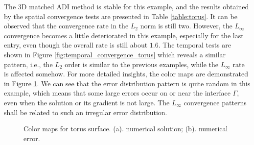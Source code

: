 \documentclass[dissertation]{uathesis}
\begin{document}
\begin{body}
\begin{flushleft}
\hspace{1cm} The 3D matched ADI method is stable for this example, and 
the results obtained by the spatial convergence tests are presented in Table \ref{table:torus}. It can be observed that the convergence rate in the $L_2$ norm is still two. However, the $L_{\infty}$ convergence becomes a little deteriorated in this example, especially for the last entry, even though the overall rate is still about $1.6$. 
The temporal tests are shown in Figure \ref{fig:temporal_convergence_torus} which reveals a similar pattern,  i.e., the $L_2$ order is similar to the previous examples, while the $L_{\infty}$ rate is affected somehow. 
For more detailed insights, the color maps are demonstrated in Figure \ref{fig:color_map_torus}. We can see that the error distribution pattern is quite random in this example, which means that  some large errors occur on or near the interface $\Gamma$, even when the solution or its gradient is not large. The $L_{\infty}$ convergence patterns shall be related to such an irregular error distribution. 

%
\begin{figure}[!ht]
	\begin{center}
	\end{center}
	\caption{Color maps for torus surface. (a). numerical solution;
		(b). numerical error.}
	\label{fig:color_map_torus}
\end{figure}


\end{flushleft}
\end{body}
\end{document}
